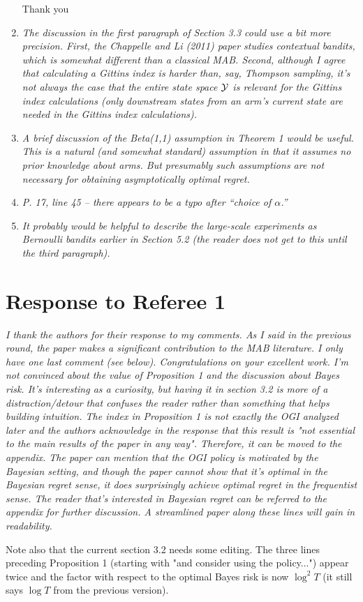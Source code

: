 \documentclass[11pt]{article}
\newcommand{\1}{\ensuremath{\mathbf{1}}} %
\theoremstyle{thm-sf}
\begin{document}
\begin{enumerate}
	
Thank you
		
	\item {\it The discussion in the first paragraph of Section 3.3 could use a bit more precision. First, the Chappelle and Li (2011) paper studies contextual bandits, which is somewhat different than a classical MAB. Second, although I agree that calculating a Gittins index is harder than, say, Thompson sampling, it’s not always the case that the entire state space $\cal{Y}$ is relevant for the Gittins index calculations (only downstream states from an arm’s current state are needed in the Gittins index calculations).}
	
	\item {\it A brief discussion of the Beta(1,1) assumption in Theorem 1 would be useful. This is a natural (and somewhat standard) assumption in that it assumes no prior knowledge about arms. But presumably such assumptions are not necessary for obtaining asymptotically optimal regret.
	}
	
	\item {\it  P. 17, line 45 – there appears to be a typo after “choice of $\alpha$.”}
	
	\item {\it It probably would be helpful to describe the large-scale experiments as Bernoulli bandits earlier in Section 5.2 (the reader does not get to this until the third paragraph).}
	\end{enumerate}
	
	\newpage
	\section{Response to  Referee 1}
	
	{\it I thank the authors for their response to my comments. As I said in the previous round, the paper makes a significant contribution to the MAB literature. I only have one last comment (see below). Congratulations on your excellent work.
		I'm not convinced about the value of Proposition 1 and the discussion about Bayes risk. It's interesting as a curiosity, but having it in section 3.2 is more of a distraction/detour that confuses the reader rather than something that helps building intuition. The index in Proposition 1 is not exactly the OGI analyzed later and the authors acknowledge in the response that this result is "not essential to the main results of the paper in any way". Therefore, it can be moved to the appendix. The paper can mention that the OGI policy is motivated by the Bayesian setting, and though the paper cannot show that it's optimal in the Bayesian regret sense, it does surprisingly achieve optimal regret in the frequentist sense. The reader that's interested in Bayesian regret can be referred to the appendix for further discussion. A streamlined paper along these lines will gain in readability.
		
Note also that the current section 3.2 needs some editing. The three lines preceding Proposition 1 (starting with "and consider using the policy...") appear twice and the factor with respect to the optimal Bayes risk is now $\log^2 T$ (it still says $\log T$ from the previous version).	
}
	
\end{document}
